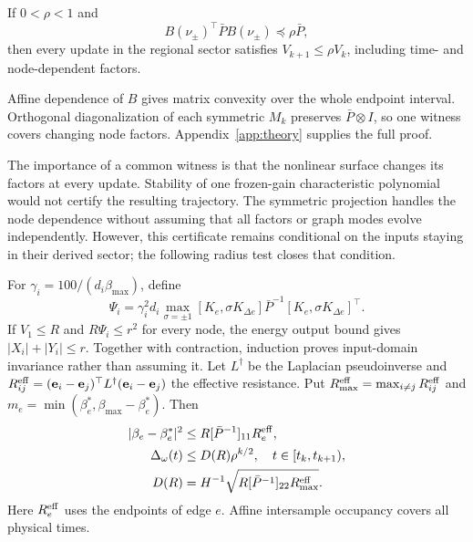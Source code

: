 \begin{btdlemma}
\label{lem:btd_endpoint}
If $0<\rho<1$ and
\begin{equation}
 B(\nu_\pm)^\top\bar P B(\nu_\pm)\preceq\rho\bar P,
 \label{eq:btd_d_endpoints}
\end{equation}
then every update in the regional sector satisfies
$V_{k+1}\le\rho V_k$, including time- and node-dependent factors.
\end{btdlemma}
Affine dependence of $B$ gives matrix convexity over the whole
endpoint interval. Orthogonal diagonalization of each symmetric
$M_k$ preserves $\bar P\otimes I$, so one witness covers changing
node factors. Appendix~\ref{app:theory} supplies the full proof.

The importance of a common witness is that the nonlinear surface
changes its factors at every update. Stability of one frozen-gain
characteristic polynomial would not certify the resulting trajectory.
The symmetric projection handles the node dependence without assuming
that all factors or graph modes evolve independently. However, this
certificate remains conditional on the inputs staying in their derived
sector; the following radius test closes that condition.

For $\gamma_i=100/(d_i\beta_{\max})$, define
\begin{equation}
 \Psi_i=\gamma_i^2d_i\max_{\sigma=\pm1}
 [K_e,\sigma K_{\Delta e}]\bar P^{-1}
 [K_e,\sigma K_{\Delta e}]^\top.
\end{equation}
If $V_1\le R$ and $R\Psi_i\le r^2$ for every node, the energy
output bound gives $|X_i|+|Y_i|\le r$. Together with contraction,
induction proves input-domain invariance rather than assuming it.
Let $L^\dagger$ be the Laplacian pseudoinverse and
$R_{ij}^{\rm eff}=(\mathbf e_i-\mathbf e_j)^\top L^\dagger
(\mathbf e_i-\mathbf e_j)$ the effective resistance. Put
$R_{\max}^{\rm eff}=\max_{i\ne j}R_{ij}^{\rm eff}$ and
$m_e=\min(\beta_e^*,\beta_{\max}-\beta_e^*)$. Then
\begin{align}
 |\beta_e-\beta_e^*|^2&\le R[\bar P^{-1}]_{11}R_e^{\rm eff},\nonumber\\
 \Delta_\omega(t)&\le D(R)\rho^{k/2},\quad t\in[t_k,t_{k+1}),\nonumber\\
 D(R)&=H^{-1}\sqrt{R[\bar P^{-1}]_{22}R_{\max}^{\rm eff}}.
 \label{eq:btd_output_bounds_short}
\end{align}
Here $R_e^{\rm eff}$ uses the endpoints of edge $e$.
Affine intersample occupancy covers all physical times.

